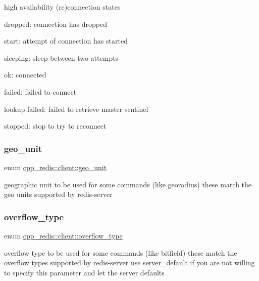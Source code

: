 high availability (re)connection states
\begin{DoxyItemize}
\item dropped\+: connection has dropped
\item start\+: attempt of connection has started
\item sleeping\+: sleep between two attempts
\item ok\+: connected
\item failed\+: failed to connect
\item lookup failed\+: failed to retrieve master sentinel
\item stopped\+: stop to try to reconnect 
\end{DoxyItemize}\mbox{\label{classcpp__redis_1_1client_aa5998536fd32ff4387c89be514997620}} 
\subsubsection{\texorpdfstring{geo\+\_\+unit}{geo\_unit}}
{\footnotesize\ttfamily enum \mbox{\hyperlink{classcpp__redis_1_1client_aa5998536fd32ff4387c89be514997620}{cpp\+\_\+redis\+::client\+::geo\+\_\+unit}}\hspace{0.3cm}{\ttfamily [strong]}}

geographic unit to be used for some commands (like georadius) these match the geo units supported by redis-\/server \mbox{\label{classcpp__redis_1_1client_a4119182ad3a01c1bb626a174375e114a}} 
\subsubsection{\texorpdfstring{overflow\+\_\+type}{overflow\_type}}
{\footnotesize\ttfamily enum \mbox{\hyperlink{classcpp__redis_1_1client_a4119182ad3a01c1bb626a174375e114a}{cpp\+\_\+redis\+::client\+::overflow\+\_\+type}}\hspace{0.3cm}{\ttfamily [strong]}}

overflow type to be used for some commands (like bitfield) these match the overflow types supported by redis-\/server use server\+\_\+default if you are not willing to specify this parameter and let the server defaults 


